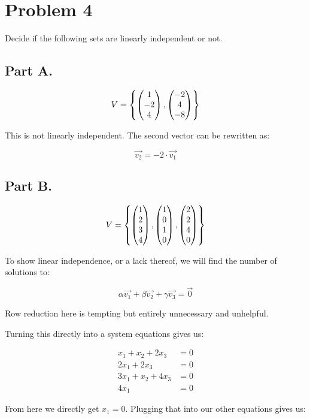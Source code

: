 \section*{Problem 4}

Decide if the following sets are linearly independent or not. 

\subsection*{Part A.}

\[V = \left\{ 
		 \begin{pmatrix} 1\\-2\\4 \end{pmatrix} ,
		 \begin{pmatrix} -2\\4\\-8 \end{pmatrix} 
\right\}\]

This is not linearly independent. The second vector can be rewritten as: 

\[\vec{v_2} = -2 \cdot \vec{v_1}\]

\subsection*{Part B.}

\[
	V = 
\left\{ 
	 \begin{pmatrix} 1\\2\\3\\4 \end{pmatrix} ,
	 \begin{pmatrix} 1\\0\\1\\0 \end{pmatrix} ,
	 \begin{pmatrix} 2\\2\\4\\0 \end{pmatrix} 
\right\}
\]

To show linear independence, or a lack thereof, we will find the number of solutions to: 

\[\alpha \vec{v_1} + \beta \vec{v_2} + \gamma \vec{v_3} = \vec{0}\]

Row reduction here is tempting but entirely unnecessary and unhelpful. 

Turning this directly into a system equations gives us:

\[
	\begin{aligned}
	x_1 + x_2 + 2x_3 &= 0 \\
	2x_1 + 2x_3 &= 0 \\
	3x_1 + x_2 + 4x_3 &= 0 \\
	4x_1 &= 0
	\end{aligned}
\]

From here we directly get $x_1 = 0$. Plugging that into our other equations gives us:


